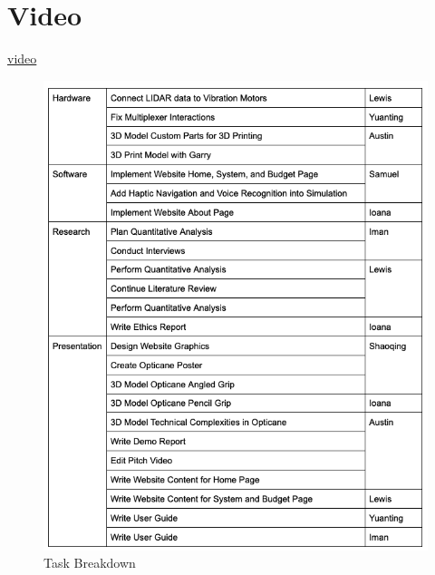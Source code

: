 \documentclass{article}
\begin{document}
\section{Video}

\href{https://uoe-my.sharepoint.com/:v:/g/personal/s1870157_ed_ac_uk/EVPEufrB3jRPn-EKBOmDpfsBlt8M4U8_-mNtX9ykO4Ew1A?e=GiO15D}{video}



\begin{figure}[tb]
\vskip 5mm
\begin{center}
\centerline{\includegraphics[width=\columnwidth]{figs/task-breakdown}}
\caption{Task Breakdown}
\label{fig:tickets}
\end{center}
\vskip -5mm
\end{figure}
\end{document}
